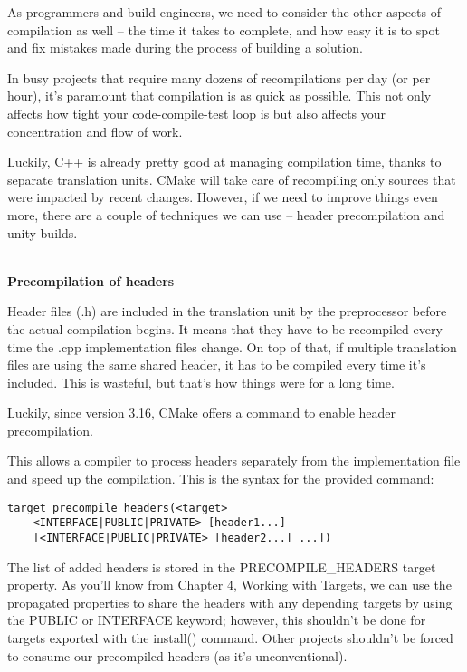 
As programmers and build engineers, we need to consider the other aspects of compilation as well – the time it takes to complete, and how easy it is to spot and fix mistakes made during the process of building a solution.


In busy projects that require many dozens of recompilations per day (or per hour), it's paramount that compilation is as quick as possible. This not only affects how tight your code-compile-test loop is but also affects your concentration and flow of work.

Luckily, C++ is already pretty good at managing compilation time, thanks to separate translation units. CMake will take care of recompiling only sources that were impacted by recent changes. However, if we need to improve things even more, there are a couple of techniques we can use – header precompilation and unity builds.

\hspace*{\fill} \\ %
\noindent
\textbf{Precompilation of headers}

Header files (.h) are included in the translation unit by the preprocessor before the actual compilation begins. It means that they have to be recompiled every time the .cpp implementation files change. On top of that, if multiple translation files are using the same shared header, it has to be compiled every time it's included. This is wasteful, but that's how things were for a long time.

Luckily, since version 3.16, CMake offers a command to enable header precompilation.

This allows a compiler to process headers separately from the implementation file and speed up the compilation. This is the syntax for the provided command:

\begin{lstlisting}[style=styleCMake]
target_precompile_headers(<target>
	<INTERFACE|PUBLIC|PRIVATE> [header1...]
	[<INTERFACE|PUBLIC|PRIVATE> [header2...] ...])
\end{lstlisting}

The list of added headers is stored in the PRECOMPILE\_HEADERS target property. As you'll know from Chapter 4, Working with Targets, we can use the propagated properties to share the headers with any depending targets by using the PUBLIC or INTERFACE keyword; however, this shouldn't be done for targets exported with the install() command. Other projects shouldn't be forced to consume our precompiled headers (as it's unconventional).

